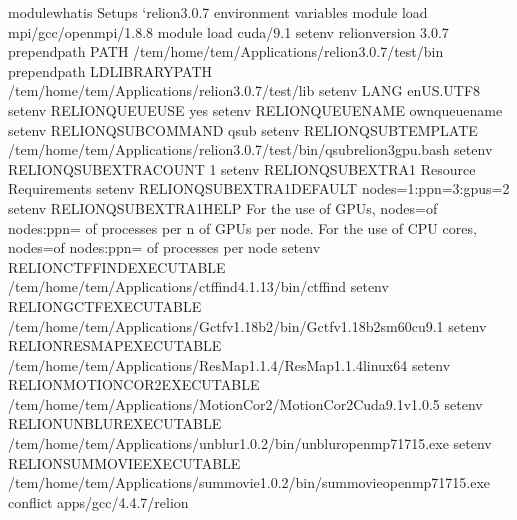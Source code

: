 \documentclass[letterpaper,10pt,english]{sphinxmanual}
\begin{document}
\begin{sphinxVerbatim}[commandchars=\\\{\}]
module\PYGZhy{}whatis    Setups {}`relion\PYGZhy{}3.0.7\PYGZsq{} environment variables
module           load mpi/gcc/openmpi/1.8.8
module           load cuda/9.1
setenv           relion\PYGZus{}version 3.0.7
prepend\PYGZhy{}path     PATH /tem/home/tem/\PYGZus{}Applications/relion\PYGZhy{}3.0.7/test/bin
prepend\PYGZhy{}path     LD\PYGZus{}LIBRARY\PYGZus{}PATH /tem/home/tem/\PYGZus{}Applications/relion\PYGZhy{}3.0.7/test/lib
setenv           LANG en\PYGZus{}US.UTF\PYGZhy{}8
setenv           RELION\PYGZus{}QUEUE\PYGZus{}USE yes
setenv           RELION\PYGZus{}QUEUE\PYGZus{}NAME own\PYGZus{}queue\PYGZus{}name
setenv           RELION\PYGZus{}QSUB\PYGZus{}COMMAND qsub
setenv           RELION\PYGZus{}QSUB\PYGZus{}TEMPLATE /tem/home/tem/\PYGZus{}Applications/relion\PYGZhy{}3.0.7/test/bin/qsub\PYGZhy{}relion3\PYGZhy{}gpu.bash
setenv           RELION\PYGZus{}QSUB\PYGZus{}EXTRA\PYGZus{}COUNT 1
setenv           RELION\PYGZus{}QSUB\PYGZus{}EXTRA1 Resource Requirements
setenv           RELION\PYGZus{}QSUB\PYGZus{}EXTRA1\PYGZus{}DEFAULT nodes=1:ppn=3:gpus=2
setenv           RELION\PYGZus{}QSUB\PYGZus{}EXTRA1\PYGZus{}HELP For the use of GPUs, nodes=\PYGZlt{}\PYGZsh{}of nodes\PYGZgt{}:ppn=\PYGZlt{}\PYGZsh{} of processes per n\PYGZsh{} of GPUs per node\PYGZgt{}. For the use of CPU cores, nodes=\PYGZlt{}\PYGZsh{}of nodes\PYGZgt{}:ppn=\PYGZlt{}\PYGZsh{} of processes per node\PYGZgt{}
setenv           RELION\PYGZus{}CTFFIND\PYGZus{}EXECUTABLE /tem/home/tem/\PYGZus{}Applications/ctffind\PYGZhy{}4.1.13/bin/ctffind
setenv           RELION\PYGZus{}GCTF\PYGZus{}EXECUTABLE /tem/home/tem/\PYGZus{}Applications/Gctf\PYGZus{}v1.18\PYGZus{}b2/bin/Gctf\PYGZus{}v1.18\PYGZus{}b2\PYGZus{}sm60\PYGZus{}cu9.1
setenv           RELION\PYGZus{}RESMAP\PYGZus{}EXECUTABLE /tem/home/tem/\PYGZus{}Applications/ResMap\PYGZhy{}1.1.4/ResMap\PYGZhy{}1.1.4\PYGZhy{}linux64
setenv           RELION\PYGZus{}MOTIONCOR2\PYGZus{}EXECUTABLE /tem/home/tem/\PYGZus{}Applications/MotionCor2/MotionCor2\PYGZus{}Cuda9.1\PYGZus{}v1.0.5
setenv           RELION\PYGZus{}UNBLUR\PYGZus{}EXECUTABLE /tem/home/tem/\PYGZus{}Applications/unblur\PYGZus{}1.0.2/bin/unblur\PYGZus{}openmp\PYGZus{}7\PYGZus{}17\PYGZus{}15.exe
setenv           RELION\PYGZus{}SUMMOVIE\PYGZus{}EXECUTABLE /tem/home/tem/\PYGZus{}Applications/summovie\PYGZus{}1.0.2/bin/sum\PYGZus{}movie\PYGZus{}openmp\PYGZus{}7\PYGZus{}17\PYGZus{}15.exe
conflict         apps/gcc/4.4.7/relion
\PYGZhy{}\PYGZhy{}\PYGZhy{}\PYGZhy{}\PYGZhy{}\PYGZhy{}\PYGZhy{}\PYGZhy{}\PYGZhy{}\PYGZhy{}\PYGZhy{}\PYGZhy{}\PYGZhy{}\PYGZhy{}\PYGZhy{}\PYGZhy{}\PYGZhy{}\PYGZhy{}\PYGZhy{}\PYGZhy{}\PYGZhy{}\PYGZhy{}\PYGZhy{}\PYGZhy{}\PYGZhy{}\PYGZhy{}\PYGZhy{}\PYGZhy{}\PYGZhy{}\PYGZhy{}\PYGZhy{}\PYGZhy{}\PYGZhy{}\PYGZhy{}\PYGZhy{}\PYGZhy{}\PYGZhy{}\PYGZhy{}\PYGZhy{}\PYGZhy{}\PYGZhy{}\PYGZhy{}\PYGZhy{}\PYGZhy{}\PYGZhy{}\PYGZhy{}\PYGZhy{}\PYGZhy{}\PYGZhy{}\PYGZhy{}\PYGZhy{}\PYGZhy{}\PYGZhy{}\PYGZhy{}\PYGZhy{}\PYGZhy{}\PYGZhy{}\PYGZhy{}\PYGZhy{}\PYGZhy{}\PYGZhy{}\PYGZhy{}\PYGZhy{}\PYGZhy{}\PYGZhy{}\PYGZhy{}\PYGZhy{}


\end{sphinxVerbatim}
\end{document}

